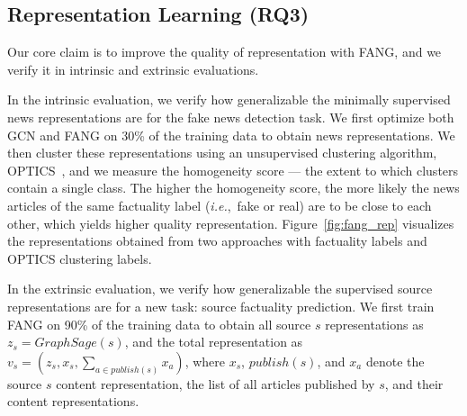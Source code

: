 \documentclass[sigconf]{acmart}
\theoremstyle{definition}
\theoremstyle{hypothesis}
\begin{document}
\subsection{Representation Learning (RQ3)}

Our core claim is to improve the quality of representation with FANG, and we verify it in intrinsic and extrinsic evaluations. 

In the intrinsic evaluation, we verify how generalizable the minimally supervised news representations are for the fake news detection task. We first optimize both GCN and FANG on 30\% of the training data to obtain news representations. We then cluster these representations using an unsupervised clustering algorithm, OPTICS~\cite{ankerst1999optics}, and we measure the homogeneity score --- the extent to which clusters contain a single class. 
The higher the homogeneity score, the more likely the news articles of the same factuality label (\textit{i.e.},~fake or real) are to be close to each other, 
which yields higher quality representation. Figure~\ref{fig:fang_rep} visualizes the representations obtained from two approaches with factuality labels and OPTICS clustering labels. 

In the extrinsic evaluation, we verify how generalizable the supervised source representations are for a new task: source factuality prediction. We first train FANG on 90\% of the training data to obtain all source $s$ representations as $z_s=GraphSage(s)$, and the total representation as $v_s=(z_s,x_s,\sum_{a\in publish(s)}x_a)$, where $x_s$, $publish(s)$, and $x_a$ denote the source $s$ content representation, the list of all articles published by $s$, and their content representations. 
\end{document}
